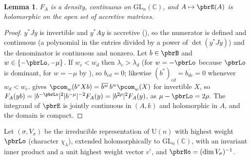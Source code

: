 \documentclass[10pt]{amsart}
\newtheorem{lemma}[theorem]{Lemma}
\theoremstyle{definition}
\theoremstyle{remark}
\newcommand{\C}{\mathbb C}
\providecommand{\auU}{\mathrm U}
\providecommand{\aubar}[1]{\overline{#1}}
\begin{document}
\begin{lemma}\label{pbr:FA}
$F_A$ is a density, continuous on $\mathrm{GL}_n(\C)$, and $A\mapsto\pbrE(A)$ is holomorphic on the
open set of accretive matrices.
\end{lemma}
\begin{proof}
$y^*Jy$ is invertible and $y^*Ay$ is accretive ({\cite[Lemma~3.18(d)]{P49}}), so the numerator is
defined and continuous (a polynomial in the entries divided by a power of $\det(y^*Jy)$) and the
denominator is continuous and nonzero. Let $b\in\pbrB$ and $w\in\{-\pbrLo,-\mu\}$. If $w_c<w_d$ then
$\lambda_c>\lambda_d$ (for $w=-\pbrLo$ because $\pbrLo$ is dominant, for $w=-\mu$ by
{\cite[Lemma~3.18(c)]{P49}}), so $b_{cd}=0$; likewise $(b^*)_{cd}=\aubar{b_{dc}}=0$ whenever $w_d<w_c$.
{\cite[Lemma~3.18(b)]{P49}} gives $\pcom_w(b^*Xb)=\aubar{b^w}\,b^w\pcom_w(X)$ for invertible $X$, so
$F_A(yb)=|b^{-\pbrLo}|^2|b^{-\mu}|^{-2}F_A(y)=|b^{2\rho}|^2F_A(y)$, as $\mu-\pbrLo=2\rho$. The integrand
of $\pbrE$ is jointly continuous in $(A,k)$ and holomorphic in $A$, and the domain is compact.
\end{proof}

Let $(\sigma,V_\sigma)$ be the irreducible representation of $\auU(n)$ with highest weight $\pbrLo$
(character $\chi_\lambda$), extended holomorphically to $\mathrm{GL}_n(\C)$, with an invariant inner
product and a unit highest weight vector $v^\circ$, and $\pbrNo=(\dim V_\sigma)^{-1}$.
\end{document}
